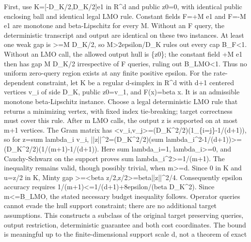 \documentclass[10pt,a4paper]{article}
\begin{document}
\begingroup\raggedright\sloppy First,\allowbreak{} use K=\allowbreak{}[-D\_\allowbreak{}K/\allowbreak{}2,\allowbreak{}D\_\allowbreak{}K/\allowbreak{}2]e1 in R\textasciicircum{}d and public z0=\allowbreak{}0,\allowbreak{} with identical public enclosing ball and identical legal LMO rule. Constant fields F=\allowbreak{}+M e1 and F=\allowbreak{}-M e1 are monotone and beta-Lipschitz for every M. Without an F query,\allowbreak{} the deterministic transcript and output are identical on these two instances. At least one weak gap is >=\allowbreak{}M D\_\allowbreak{}K/\allowbreak{}2,\allowbreak{} so M>2epsilon/\allowbreak{}D\_\allowbreak{}K rules out every cap B\_\allowbreak{}F<1. Without an LMO call,\allowbreak{} the allowed output hull is \{z0\};\allowbreak{} the constant field +M e1 then has gap M D\_\allowbreak{}K/\allowbreak{}2 irrespective of F queries,\allowbreak{} ruling out B\_\allowbreak{}LMO<1. Thus no uniform zero-query region exists at any finite positive epsilon. For the rate-dependent constraint,\allowbreak{} let K be a regular d-simplex in R\textasciicircum{}d with d+1 centered vertices v\_\allowbreak{}i of side D\_\allowbreak{}K,\allowbreak{} public z0=\allowbreak{}v\_\allowbreak{}1,\allowbreak{} and F(x)=\allowbreak{}beta x. It is an admissible monotone beta-Lipschitz instance. Choose a legal deterministic LMO rule that returns a minimizing vertex,\allowbreak{} with fixed index tie-breaking;\allowbreak{} target correctness must cover this rule. After m LMO calls,\allowbreak{} the output z is supported on at most m+1 vertices. The Gram matrix has <v\_\allowbreak{}i,\allowbreak{}v\_\allowbreak{}j>=\allowbreak{}(D\_\allowbreak{}K\textasciicircum{}2/\allowbreak{}2)(1\_\allowbreak{}\{i=\allowbreak{}j\}-1/\allowbreak{}(d+1)),\allowbreak{} so for z=\allowbreak{}sum lambda\_\allowbreak{}i v\_\allowbreak{}i,\allowbreak{} ||z||\textasciicircum{}2=\allowbreak{}(D\_\allowbreak{}K\textasciicircum{}2/\allowbreak{}2)(sum lambda\_\allowbreak{}i\textasciicircum{}2-1/\allowbreak{}(d+1))>=\allowbreak{}(D\_\allowbreak{}K\textasciicircum{}2/\allowbreak{}2)(1/\allowbreak{}(m+1)-1/\allowbreak{}(d+1)). Here sum lambda\_\allowbreak{}i=\allowbreak{}1,\allowbreak{} lambda\_\allowbreak{}i>=\allowbreak{}0,\allowbreak{} and Cauchy-Schwarz on the support proves sum lambda\_\allowbreak{}i\textasciicircum{}2>=\allowbreak{}1/\allowbreak{}(m+1). The inequality remains valid,\allowbreak{} though possibly trivial,\allowbreak{} when m>=\allowbreak{}d. Since 0 in K and u=\allowbreak{}z/\allowbreak{}2 in K,\allowbreak{} Minty gap >=\allowbreak{}<beta z/\allowbreak{}2,\allowbreak{}z/\allowbreak{}2>=\allowbreak{}beta||z||\textasciicircum{}2/\allowbreak{}4. Consequently epsilon accuracy requires 1/\allowbreak{}(m+1)<=\allowbreak{}1/\allowbreak{}(d+1)+8epsilon/\allowbreak{}(beta D\_\allowbreak{}K\textasciicircum{}2). Since m<=\allowbreak{}B\_\allowbreak{}LMO,\allowbreak{} the stated necessary budget inequality follows. Operator queries cannot evade the hull support constraint;\allowbreak{} there are no additional target assumptions. This constructs a subclass of the original target preserving queries,\allowbreak{} output restriction,\allowbreak{} deterministic guarantee and both cost coordinates. The bound is meaningful up to the finite-dimensional support scale d,\allowbreak{} not a theorem of exact 
\end{document}
